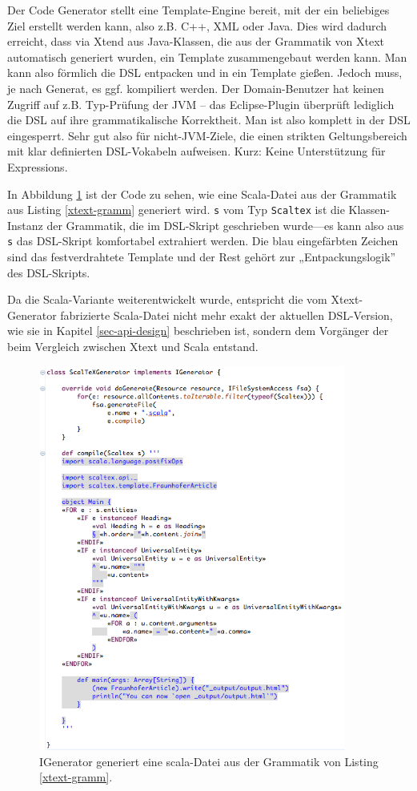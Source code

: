 Der Code Generator stellt eine Template-Engine bereit, mit der
ein beliebiges Ziel erstellt werden kann, also z.B. C++, XML oder Java.
Dies wird dadurch erreicht, dass via Xtend aus Java-Klassen, die aus der
Grammatik von Xtext automatisch generiert wurden, ein Template zusammengebaut
werden kann. Man kann also förmlich die DSL entpacken und in ein Template
gießen.
Jedoch muss, je nach Generat, es ggf. kompiliert werden. Der
Domain-Benutzer hat keinen Zugriff auf z.B. Typ-Prüfung der JVM --
das Eclipse-Plugin überprüft lediglich die DSL auf ihre
grammatikalische Korrektheit. Man ist also komplett in der DSL eingesperrt.
Sehr gut also für nicht-JVM-Ziele, die einen strikten Geltungsbereich mit
klar definierten DSL-Vokabeln aufweisen. Kurz: Keine Unterstützung für
Expressions.\cite{xtext}

In Abbildung \ref{fig-igenerator} ist der Code zu sehen, wie eine
Scala-Datei aus der Grammatik aus Listing \ref{xtext-gramm} generiert wird.
\verb+s+ vom Typ \verb+Scaltex+ ist die Klassen-Instanz der Grammatik,
die im DSL-Skript geschrieben wurde---es kann also aus \verb+s+ das DSL-Skript
komfortabel extrahiert werden. Die blau eingefärbten Zeichen sind
das festverdrahtete Template und der Rest gehört zur
„Entpackungslogik” des DSL-Skripts.

Da die Scala-Variante weiterentwickelt wurde, entspricht
die vom Xtext-Generator fabrizierte Scala-Datei nicht mehr exakt der
aktuellen DSL-Version, wie sie in Kapitel \ref{sec-api-design} beschrieben ist,
sondern dem Vorgänger der beim Vergleich zwischen Xtext und Scala
entstand.

\begin{figure}[h!]
  \centering
    \includegraphics[width=0.9\textwidth]{figures/igenerator.png}
  \caption{IGenerator generiert eine scala-Datei aus der Grammatik von Listing \ref{xtext-gramm}.}\label{fig-igenerator}
\end{figure}

